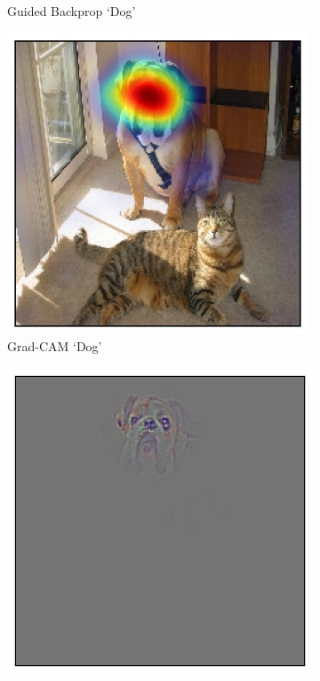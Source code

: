 \begin{figure}[t!]
\begin{subfigure}[t]{0.161\textwidth}
		\caption{\scriptsize{Guided Backprop `Dog'}\hspace{-12pt}}
        \label{fig:teaser_gb_dog}
	\end{subfigure}
	\begin{subfigure}[t]{0.161\textwidth}
		\centering
        \includegraphics[width=\textwidth]{figures/teaser/newgcam_heatmap_overlaid_243_cat_dog_with_margin_small.jpg}
        \caption{\scriptsize{Grad-CAM `Dog'}\hspace{-12pt}}
        \label{fig:teaser_gcam_dog}
	\end{subfigure}
	\begin{subfigure}[t]{0.161\textwidth}
		\centering
        \includegraphics[width=1.01\textwidth]{figures/teaser/gbgcam_dog_margin.jpg}

\end{subfigure}
\end{figure}
